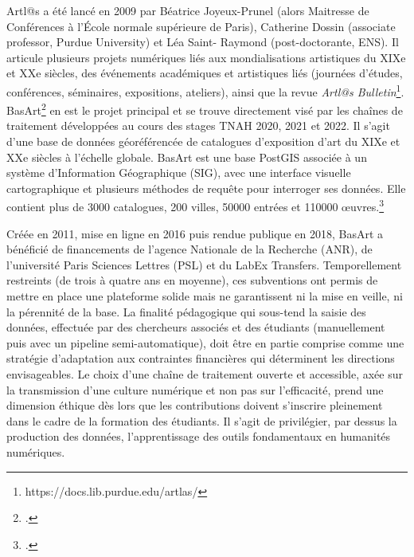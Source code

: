 \documentclass[a4paper,12pt,twoside]{book}
\begin{document}
Artl@s a été lancé en 2009 par Béatrice Joyeux-Prunel (alors Maitresse de Conférences à l'École normale supérieure de Paris), Catherine Dossin (associate professor, Purdue University) et Léa Saint- Raymond (post-doctorante, ENS). Il articule plusieurs projets numériques liés aux mondialisations artistiques du XIXe et XXe siècles, des événements académiques et artistiques liés (journées d'études, conférences, séminaires, expositions, ateliers), ainsi que la revue \textit{Artl@s Bulletin}\footnote{https://docs.lib.purdue.edu/artlas/}. BasArt\footcite{Basart} en est le projet principal et se trouve directement visé par les chaînes de traitement développées au cours des stages TNAH 2020, 2021 et 2022. Il s'agit d’une base de données géoréférencée de catalogues d'exposition d'art du XIXe et XXe siècles à l'échelle globale. BasArt est une base PostGIS associée à un système d’Information Géographique (SIG), avec une interface visuelle cartographique et plusieurs méthodes de requête pour interroger ses données. Elle contient plus de 3000 catalogues, 200 villes, 50000 entrées et 110000 œuvres.\footcite{joyeux-prunelARTLSpatialTransnational2012}

Créée en 2011, mise en ligne en 2016 puis rendue publique en 2018, BasArt a bénéficié de financements de l'agence Nationale de la Recherche (ANR), de l'université Paris Sciences Lettres (PSL) et du LabEx Transfers. Temporellement restreints (de trois à quatre ans en moyenne), ces subventions ont permis de mettre en place une plateforme solide mais ne garantissent ni la mise en veille, ni la pérennité de la base. La finalité pédagogique qui sous-tend la saisie des données, effectuée par des chercheurs associés et des étudiants (manuellement puis avec un pipeline semi-automatique), doit être en partie comprise comme une stratégie d'adaptation aux contraintes financières qui déterminent les directions envisageables. Le choix d'une chaîne de traitement ouverte et accessible, axée sur la transmission d'une culture numérique et non pas sur l'efficacité, prend une dimension éthique dès lors que les contributions doivent s'inscrire pleinement dans le cadre de la formation des étudiants. Il s'agit de privilégier, par dessus la production des données, l'apprentissage des outils fondamentaux en humanités numériques.
\end{document}
